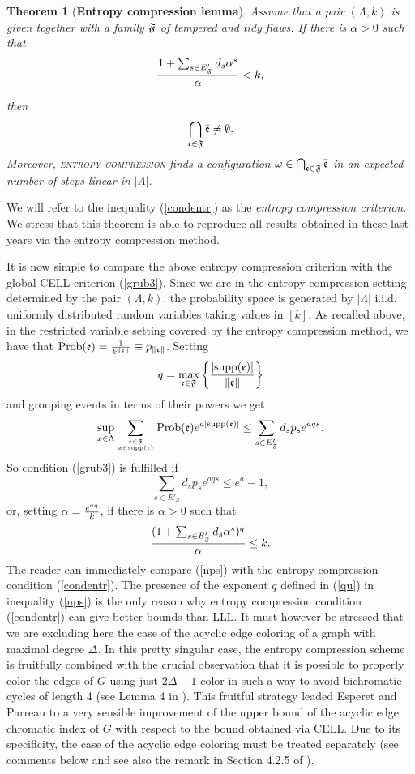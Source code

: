 \documentclass[11pt]{article}
\newtheorem{theo}{Theorem}[section]
\let\a=\alpha \let\b=\beta \let\ch=\chi \let\d=\delta \let\e=\varepsilon
\let\D=\Delta \let\F=\Phi \let\G=\Gamma \let\L=\Lambda \let\Th=\Theta
\let\\=\noindent
\def\ee{\end{equation}}
\def\be{\begin{equation}}
\let\a=\alpha \let\b=\beta \let\ch=\chi \let\d=\delta \let\e=\varepsilon
\let\D=\Delta \let\F=\Phi \let\G=\Gamma \let\L=\Lambda \let\Th=\Theta
\let\\=\noindent
\def\ee{\end{equation}}
\def\be{\begin{equation}}
\def\obj{{\rm supp}}
\def\prob{{\rm Prob}}
\def\ev{{\mathfrak{e}}}
\def\FF{{\mathfrak{F}}}
\def\0{\emptyset}
\begin{document}
 \begin{theo}[{\bf Entropy compression  lemma}]\label{ecl}
  Assume that a  pair $(\L,k)$ is given together with
a family  ${\mathfrak{F}}$  of tempered and tidy flaws. If there is $\a>0$ such that
\begin{equation}\label{condentr}
{1+ \sum_{s\in E'_\fa} d_s\a^s\over \a}< k,
\end{equation}

\\then
$$
\bigcap_{\ev\in \fa}\bar \ev\neq\0.
$$
Moreover, \textsc{entropy compression} finds a configuration $\o\in \bigcap_{\ev\in \fa}\bar \ev$  in an expected number of steps linear in $|\L|$.
\end{theo}

\\We will refer to the inequality (\ref{condentr}) as the {\it entropy compression criterion}.  We stress that this theorem is able to reproduce
all results obtained in these last years via the entropy compression method.


\\It is now simple to compare the above entropy compression criterion with the global CELL criterion (\ref{grub3}). Since we are in the entropy compression setting determined by the pair $(\L,k)$, the probability space is generated
by $|\L|$ i.i.d. uniformly distributed random variables taking values in $[k]$.
As recalled above, in the restricted variable setting covered by the entropy compression method, we have that $\prob(\ev)={1\over k^{\|\ev\|}}\equiv p_{\|\ev\|}$. Setting
\be\label{qu}
q=\max_{\ev\in \fa}\left\{ {|\obj(\ev)|\over \|\ev\|}\right\}
\ee
and grouping events in terms of their powers we get
$$
\sup_{x\in \L}\sum_{\ev\in \FF\atop x\in \obj(\ev)}\prob(\ev)e^{a|\obj(\ev)|}\le {{\sum_{s\in E_\FF'} d_s p_s{e^{aqs}}}}.
$$
So condition (\ref{grub3}) is fulfilled  if
\be\label{nps2}
{{\sum_{s\in E'_\FF} d_s p_s{e^{aqs}}}}\le e^a-1,
\ee
or, setting $\a={e^{aq}\over k}$,
if there is $\a>0$ such that
\be\label{nps}
{(1+ \sum_{s\in E'_\FF} d_s\a^s)^q\over \a}\le k.
\ee
\\The reader can immediately compare (\ref{nps})  with  the entropy compression  condition (\ref{condentr}).
The presence of the exponent $q$ defined in (\ref{qu}) in inequality (\ref{nps}) is the only reason why entropy compression condition (\ref{condentr})  can  give better bounds than LLL. It must however be stressed that we are  excluding  here  the  case of the acyclic edge coloring of a graph with maximal degree $\D$. In this pretty singular case,  the entropy compression scheme is fruitfully combined with
the crucial observation that it is possible to properly color the edges of $G$ using just $2\D-1$ color in such a way to avoid
bichromatic cycles of length 4  (see Lemma 4 in \cite{APS}). This  fruitful strategy leaded Esperet and Parreau
to a very sensible   improvement of the upper bound of the acyclic edge chromatic index of $G$ with respect to the bound obtained via CELL.
Due to its specificity, the  case of the acyclic edge coloring  must be treated separately (see comments below and see also the remark in Section 4.2.5 of \cite{APS}).
\end{document}
